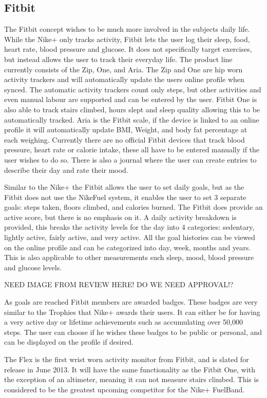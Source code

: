 \subsection{Fitbit}
The Fitbit concept wishes to be much more involved in the subjects daily life. While the Nike+ only tracks activity, Fitbit lets the user log their sleep, food, heart rate, blood pressure and glucose. It does not specifically target exercises, but instead allows the user to track their everyday life. The product line currently consists of the Zip, One, and Aria. The Zip and One are hip worn activity trackers and will automatically update the users online profile when synced. The automatic activity trackers count only steps, but other activities and even manual labour are supported and can be entered by the user. Fitbit One is also able to track stairs climbed, hours slept and sleep quality allowing this to be automatically tracked. Aria is the Fitbit scale, if the device is linked to an online profile it will automatically update BMI, Weight, and body fat percentage at each weighing. Currently there are no official Fitbit devices that track blood pressure, heart rate or calorie intake, these all have to be entered manually if the user wishes to do so. There is also a journal where the user can create entries to describe their day and rate their mood.

Similar to the Nike+ the Fitbit allows the user to set daily goals, but as the Fitbit does not use the NikeFuel system, it enables the user to set 3 separate goals: steps taken, floors climbed, and calories burned. The Fitbit does provide an active score, but there is no emphasis on it. A daily activity breakdown is provided, this breaks the activity levels for the day into 4 categories: sedentary, lightly active, fairly active, and very active. All the goal histories can be viewed on the online profile and can be categorized into day, week, months and years. This is also applicable to other measurements such sleep, mood, blood pressure and glucose levels. 

NEED IMAGE FROM REVIEW HERE! DO WE NEED APPROVAL!?

As goals are reached Fitbit members are awarded badges. These badges are very similar to the Trophies that Nike+ awards their users. It can either be for having a very active day or lifetime achievements such as accumulating over 50,000 steps. The user can choose if he wishes these badges to be public or personal, and can be displayed on the profile if desired.

The Flex is the first wrist worn activity monitor from Fitbit, and is slated for release in June 2013. It will have the same functionality as the Fitbit One, with the exception of an altimeter, meaning it can not measure stairs climbed. This is considered to be the greatest upcoming competitor for the Nike+ FuelBand.

